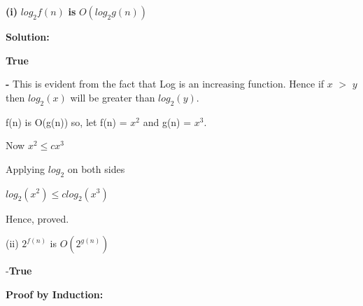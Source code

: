 \documentclass[letterpaper,portrait,12pt]{article}
\begin{document}
\begin{flushleft}
\textbf{(i) }$log_2 f(n)$\textbf{ is }$O(log_2g(n))$
\end{flushleft}


\begin{flushleft}
\textbf{Solution:}
\end{flushleft}


\begin{flushleft}
\textbf{True}
\end{flushleft}


\begin{flushleft}
\textbf{- }This is evident from the fact that Log is an increasing function. Hence if $x$ $>$ $y$ then $log_2(x)$ will be greater than $log_2(y)$.
\end{flushleft}


\begin{flushleft}

\end{flushleft}


\begin{flushleft}
f(n) is O(g(n)) so, let f(n) = $x^2$ and g(n) = $x^3$.
\end{flushleft}


\begin{flushleft}

\end{flushleft}


\begin{flushleft}
Now $x^2 \le c  x^3$ 
\end{flushleft}


\begin{flushleft}
Applying $log_2$ on both sides
\end{flushleft}


\begin{flushleft}
$log_2(x^2) \le clog_2(x^3)$
\end{flushleft}


\begin{flushleft}
Hence, proved.
\end{flushleft}


\begin{flushleft}
(ii) $2^{f(n)}$ is $O(2^{g(n)})$
\end{flushleft}


\begin{flushleft}
-\textbf{True}
\end{flushleft}


\begin{flushleft}
\textbf{P}\textbf{roof by Ind}\textbf{uction:}
\end{flushleft}
\end{document}
